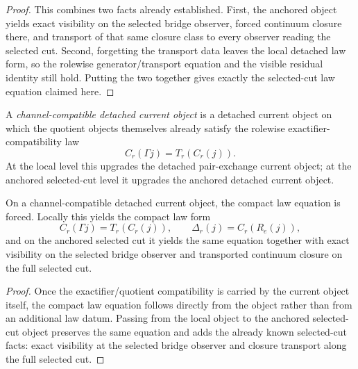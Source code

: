 \begin{proof}
This combines two facts already established. First, the anchored object yields
exact visibility on the selected bridge observer, forced continuum closure
there, and transport of that same closure class to every observer reading the
selected cut. Second, forgetting the transport data leaves the local detached
law form, so the rolewise generator/transport equation and the visible
residual identity still hold. Putting the two together gives exactly the
selected-cut law equation claimed here.
\end{proof}

\begin{definition}
\label{def:channel-compatible-detached-current-object}
A \emph{channel-compatible detached current object} is a detached current
object on which the quotient objects themselves already satisfy the rolewise
exactifier-compatibility law
\[
C_r(\Gamma j)=T_r(C_r(j)).
\]
At the local level this upgrades the detached pair-exchange current object; at
the anchored selected-cut level it upgrades the anchored detached current
object.
\end{definition}

\begin{theorem}
\label{thm:channel-compatible-current-object-forces-the-flagship-law}
On a channel-compatible detached current object, the compact law equation is
forced.
Locally this yields the compact law form
\[
C_r(\Gamma j)=T_r(C_r(j)),
\qquad
\Delta_r(j)=C_r(R_e(j)),
\]
and on the anchored selected cut it yields the same equation together with
exact visibility on the selected bridge observer and transported continuum
closure on the full selected cut.
\end{theorem}

\begin{proof}
Once the exactifier/quotient compatibility is carried by the current object
itself, the compact law equation follows directly from the object rather than
from an additional law datum. Passing from the local object to the
anchored selected-cut object preserves the same equation and adds the already
known selected-cut facts: exact visibility at the selected bridge observer and
closure transport along the full selected cut.
\end{proof}

